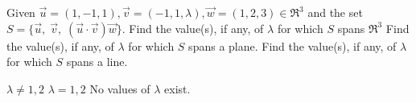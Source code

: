 
\begin{Exercise}[
name={},
title={}, 
difficulty=0,
origin={\cite{YL}}]
Given $\vec{u}=(1,-1,1), \vec{v}=(-1,1,\lambda), \vec{w}=(1, 2, 3)\in\Re^3$ and the set
$S=\{\vec{u},\; \vec{v},\; (\vec{u}\cdot \vec{v})\vec{w}\}$.
\Question Find the value(s), if any, of $\lambda$ for
which $S$ spans $\Re^3$
\Question Find the value(s), if any, of $\lambda$ for
which $S$ spans a plane.
\Question Find the value(s), if any, of $\lambda$ for
which $S$ spans a line.
\end{Exercise}

\begin{Answer}
\begin{multicols}{3}
\Question $\lambda\neq1,2$
\Question $\lambda=1,2$
\Question No values of $\lambda$ exist.
\EndCurrentQuestion
\end{multicols}
\end{Answer}
